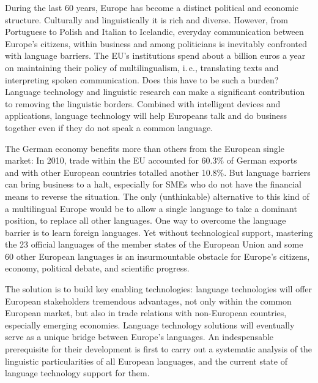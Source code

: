 \documentclass[]{../../metanetpaper}
\begin{document}
\begin{multicols}{2}

During the last 60 years, Europe has become a distinct political and economic structure. Culturally and linguistically it is rich and diverse. However, from Portuguese to Polish and Italian to Icelandic, everyday communication between Europe’s citizens, within business and among politicians is inevitably confronted with language barriers. The EU's institutions spend about a billion euros a year on maintaining their policy of multilingualism, i.\,e., translating texts and interpreting spoken communication. Does this have to be such a burden? Language technology and linguistic research can make a significant contribution to removing the linguistic borders. Combined with intelligent devices and applications, language technology will help Europeans talk and do business together even if they do not speak a common language. 


The German economy benefits more than others from the European single market: In 2010, trade within the EU accounted for 60.3\% of German exports and with other European countries totalled another 10.8\%. But language barriers can bring business to a halt, especially for SMEs who do not have the financial means to reverse the situation. The only (unthinkable) alternative to this kind of a multilingual Europe would be to allow a single language to take a dominant position, to replace all other languages. 
One way to overcome the language barrier is to learn foreign languages. Yet without technological support, mastering the 23 official languages of the member states of the European Union and some 60 other European languages is an insurmountable obstacle for Europe’s citizens, economy, political debate, and scientific progress. 

The solution is to build key enabling technologies: language technologies will offer European stakeholders tremendous advantages, not only within the common European market, but also in trade relations with non-European countries, especially emerging economies. Language technology solutions will eventually serve as a unique bridge between Europe's languages. An indespensable prerequisite for their development is first to carry out a systematic analysis of the linguistic particularities of all European languages, and the current state of language technology support for them.  
    

\end{multicols}
\end{document}
